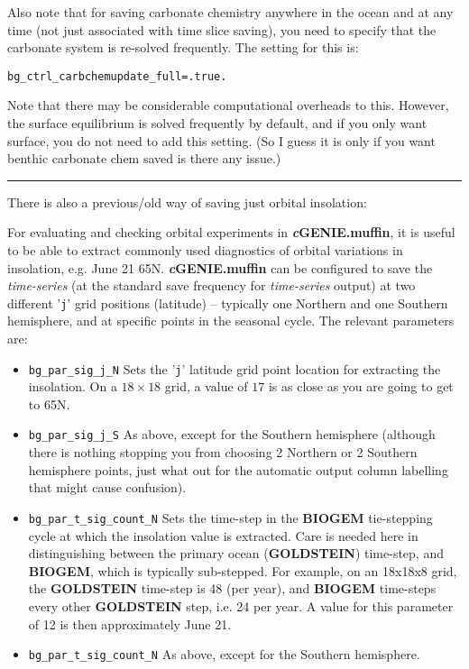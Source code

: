 \documentclass[11pt,fleqn]{book} %
\begin{document}
Also note that for saving carbonate chemistry anywhere in the ocean and at any time (not just associated with time slice saving), you need to specify that the carbonate system is re-solved frequently. The setting for this is:
\begin{verbatim}
bg_ctrl_carbchemupdate_full=.true.
\end{verbatim}
Note that there may be considerable computational overheads to this.
However, the surface equilibrium is solved frequently by default, and if you only want surface, you do not need to add this setting. (So I guess it is only if you want benthic carbonate chem saved is there any issue.)

\vspace{1mm}
\noindent\rule{4cm}{0.5pt}
\vspace{2mm}

\noindent There is also a previous/old way of saving just orbital insolation:

For evaluating and checking orbital experiments in \textbf{\textit{c}GENIE.muffin}, it is useful to be able to extract commonly used diagnostics of orbital variations in insolation, e.g. June 21 65N. \textbf{\textit{c}GENIE.muffin} can be configured to save the \textit{time-series} (at the standard save frequency for \textit{time-series} output) at two different '\texttt{j}' grid positions (latitude) -- typically one Northern and one Southern hemisphere, and at specific points in the seasonal cycle. The relevant parameters are:

\begin{itemize}
\vspace{1mm}
\item \texttt{bg\_par\_sig\_j\_N}
Sets the '\texttt{j}'  latitude grid point location for extracting the insolation. On a \(18\times18\) grid, a value of \(17\) is as close as you are going to get to 65N.
\vspace{1mm}
\item \texttt{bg\_par\_sig\_j\_S}
As above, except for the Southern hemisphere (although there is nothing stopping you from choosing 2 Northern or 2 Southern hemisphere points, just what out for the automatic output column labelling that might cause confusion).
\vspace{1mm}
\item \texttt{bg\_par\_t\_sig\_count\_N}
Sets the time-step in the \textbf{BIOGEM} tie-stepping cycle at which the insolation value is extracted. Care is needed here in distinguishing between the primary ocean (\textbf{GOLDSTEIN}) time-step, and \textbf{BIOGEM}, which is typically sub-stepped. For  example, on an 18x18x8 grid, the \textbf{GOLDSTEIN} time-step is 48 (per year), and \textbf{BIOGEM} time-steps every other \textbf{GOLDSTEIN} step, i.e. 24 per year. A value for this parameter of 12 is then approximately June 21.
\vspace{1mm}
\item \texttt{bg\_par\_t\_sig\_count\_N}
As above, except for the Southern hemisphere.
\end{itemize}
\vspace{2mm}
\end{document}
